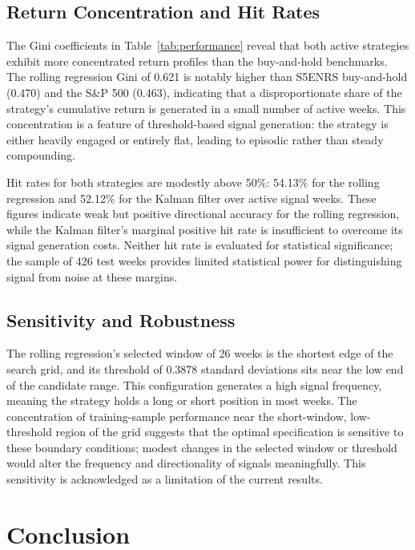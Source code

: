 \documentclass[12pt]{article}
\begin{document}
\subsection{Return Concentration and Hit Rates}

The Gini coefficients in Table~\ref{tab:performance} reveal that both active strategies exhibit more concentrated return profiles than the buy-and-hold benchmarks. The rolling regression Gini of 0.621 is notably higher than S5ENRS buy-and-hold (0.470) and the S\&P 500 (0.463), indicating that a disproportionate share of the strategy's cumulative return is generated in a small number of active weeks. This concentration is a feature of threshold-based signal generation: the strategy is either heavily engaged or entirely flat, leading to episodic rather than steady compounding.

Hit rates for both strategies are modestly above 50\%: 54.13\% for the rolling regression and 52.12\% for the Kalman filter over active signal weeks. These figures indicate weak but positive directional accuracy for the rolling regression, while the Kalman filter's marginal positive hit rate is insufficient to overcome its signal generation costs. Neither hit rate is evaluated for statistical significance; the sample of 426 test weeks provides limited statistical power for distinguishing signal from noise at these margins.

\subsection{Sensitivity and Robustness}

The rolling regression's selected window of 26 weeks is the shortest edge of the search grid, and its threshold of 0.3878 standard deviations sits near the low end of the candidate range. This configuration generates a high signal frequency, meaning the strategy holds a long or short position in most weeks. The concentration of training-sample performance near the short-window, low-threshold region of the grid suggests that the optimal specification is sensitive to these boundary conditions; modest changes in the selected window or threshold would alter the frequency and directionality of signals meaningfully. This sensitivity is acknowledged as a limitation of the current results.

\section{Conclusion}
\label{sec:conclusion}
\end{document}
